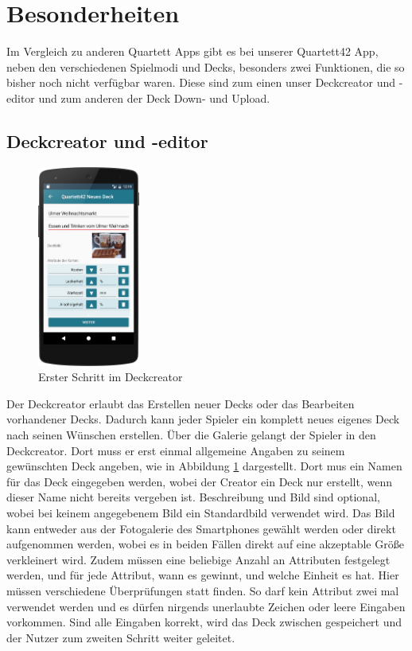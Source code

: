 \section{Besonderheiten}
\label{sec:implementierung:besonderheiten }

Im Vergleich zu anderen Quartett Apps gibt es bei unserer Quartett42 App, neben den verschiedenen Spielmodi und Decks, besonders zwei Funktionen, die so bisher noch nicht verfügbar waren. Diese sind zum einen unser Deckcreator und -editor und zum anderen der Deck Down- und Upload.	

\subsection{Deckcreator und -editor}
\label{sec:implementierung:besonderheiten:deckcreator }

\begin{figure}[htp]
	\centering
  	\includegraphics[width=0.3\textwidth]{img/screenshots/device_new_deck.png}
	\caption{Erster Schritt im Deckcreator}
	\label{figure:implementierungdeckcreator}
\end{figure}

Der Deckcreator erlaubt das Erstellen neuer Decks oder das Bearbeiten vorhandener Decks. Dadurch kann jeder Spieler ein komplett neues eigenes Deck nach seinen Wünschen erstellen. Über die Galerie gelangt der Spieler in den Deckcreator. Dort muss er erst einmal allgemeine Angaben zu seinem gewünschten Deck angeben, wie in Abbildung \ref{figure:implementierungdeckcreator} dargestellt. Dort mus ein Namen für das Deck eingegeben werden, wobei der Creator ein Deck nur erstellt, wenn dieser Name nicht bereits vergeben ist. Beschreibung und Bild sind optional, wobei bei keinem angegebenem Bild ein Standardbild verwendet wird. Das Bild kann entweder aus der Fotogalerie des Smartphones gewählt werden oder direkt aufgenommen werden, wobei es in beiden Fällen direkt auf eine akzeptable Größe verkleinert wird. Zudem müssen eine beliebige Anzahl an Attributen festgelegt werden, und für jede Attribut, wann es gewinnt, und welche Einheit es hat. Hier müssen verschiedene Überprüfungen statt finden. So darf kein Attribut zwei mal verwendet werden und es dürfen nirgends unerlaubte Zeichen oder leere Eingaben vorkommen. Sind alle Eingaben korrekt, wird das Deck zwischen gespeichert und der Nutzer zum zweiten Schritt weiter geleitet.

